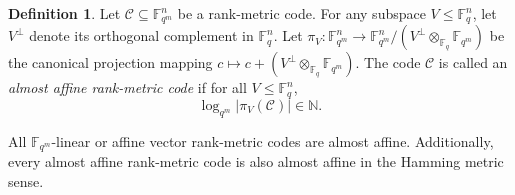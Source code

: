 \documentclass[a4paper,11pt,reqno]{article}
\newcommand{\F}{\mathbb{F}}
\theoremstyle{plain} \numberwithin{equation}{section}
\theoremstyle{definition}
\newtheorem{definition}[theorem]{Definition}
\begin{document}
\begin{definition}
Let $\mathcal{C} \subseteq \mathbb{F}_{q^m}^n$ be a rank-metric code. For any subspace $V \le \mathbb{F}_q^n$, let $V^\perp$ denote its orthogonal complement in $\mathbb{F}_q^n$. Let $\pi_V \colon \mathbb{F}_{q^m}^n \to \mathbb{F}_{q^m}^n / (V^\perp \otimes_{\F_q}\mathbb{F}_{q^m})$ be the canonical projection mapping $c \mapsto c + (V^\perp \otimes_{\F_q}\mathbb{F}_{q^m})$. The code $\mathcal{C}$ is called an \emph{almost affine rank-metric code} if for all $V \le \mathbb{F}_q^n$,
$$ \log_{q^m} |\pi_V(\mathcal{C})| \in \mathbb{N}. $$
\end{definition}


All $\F_{q^m}$-linear or affine vector rank-metric codes are almost affine. Additionally, every almost affine rank-metric code is also almost affine in the Hamming metric sense.
\end{document}
